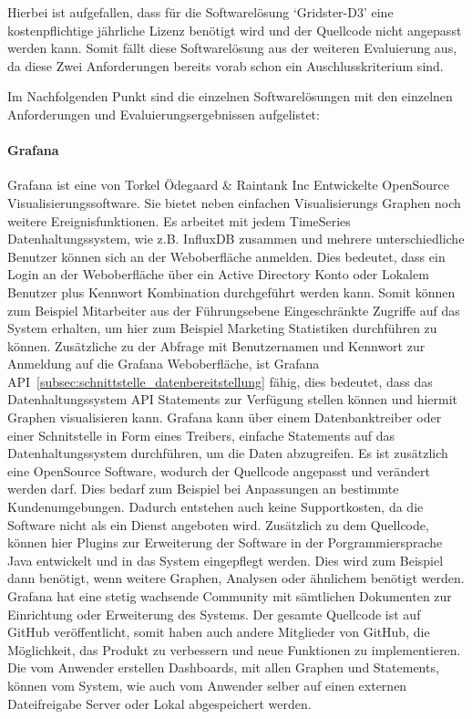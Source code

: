 Hierbei ist aufgefallen, dass für die Softwarelösung `Gridster-D3' eine
kostenpflichtige jährliche Lizenz benötigt wird und der Quellcode nicht
angepasst werden kann. Somit fällt diese Softwarelösung aus der weiteren
Evaluierung aus, da diese Zwei Anforderungen bereits vorab schon ein
Auschlusskriterium sind.

Im Nachfolgenden Punkt sind die einzelnen Softwarelösungen mit den einzelnen
Anforderungen und Evaluierungsergebnissen aufgelistet:

\paragraph{Grafana}
\label{paragraph:grafana}
Grafana ist eine von Torkel Ödegaard \& Raintank Inc Entwickelte OpenSource
Visualisierungssoftware. Sie bietet neben einfachen Visualisierungs Graphen
noch weitere Ereignisfunktionen. Es arbeitet mit jedem TimeSeries
Datenhaltungssystem, wie z.B. InfluxDB zusammen und mehrere unterschiedliche
Benutzer können sich an der Weboberfläche anmelden. Dies bedeutet, dass ein
Login an der Weboberfläche über ein \gls{Active Directory} Konto oder Lokalem
Benutzer plus Kennwort Kombination durchgeführt werden kann. Somit können zum
Beispiel Mitarbeiter aus der Führungsebene Eingeschränkte Zugriffe auf das
System erhalten, um hier zum Beispiel Marketing Statistiken durchführen zu
können. Zusätzliche zu der Abfrage mit Benutzernamen und Kennwort zur Anmeldung
auf die Grafana Weboberfläche, ist Grafana
API~\ref{subsec:schnittstelle_datenbereitstellung} fähig, dies bedeutet, dass
das Datenhaltungssystem API Statements zur Verfügung stellen können und hiermit
Graphen visualisieren kann. Grafana kann über einem \gls{Datenbanktreiber}
oder einer Schnitstelle in Form eines Treibers, einfache Statements auf das
Datenhaltungssystem durchführen, um die Daten abzugreifen. Es ist zusätzlich
eine OpenSource Software, wodurch der Quellcode angepasst und verändert werden
darf. Dies bedarf zum Beispiel bei Anpassungen an bestimmte Kundenumgebungen.
Dadurch entstehen auch keine Supportkosten, da die Software nicht als ein
Dienst angeboten wird. Zusätzlich zu dem Quellcode, können hier Plugins zur
Erweiterung der Software in der Porgrammiersprache Java entwickelt und in das
System eingepflegt werden. Dies wird zum Beispiel dann benötigt, wenn weitere
Graphen, Analysen oder ähnlichem benötigt werden.  Grafana hat eine stetig
wachsende Community mit sämtlichen Dokumenten zur Einrichtung oder Erweiterung
des Systems. Der gesamte Quellcode ist auf GitHub veröffentlicht, somit haben
auch andere Mitglieder von GitHub, die Möglichkeit, das Produkt zu verbessern
und neue Funktionen zu implementieren. Die vom Anwender erstellen Dashboards,
mit allen Graphen und Statements, können vom System, wie auch vom Anwender
selber auf einen externen Dateifreigabe Server oder Lokal abgespeichert werden.


